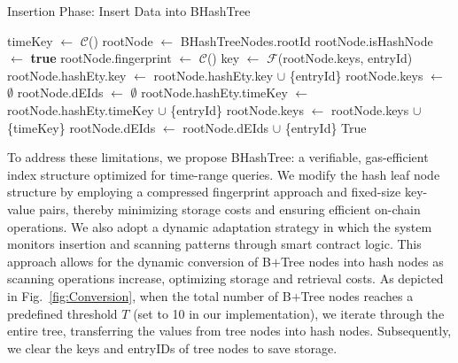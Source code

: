 \begin{algorithm}[htbp]
\caption{Insertion Phase: Insert Data into BHashTree}
\label{Insert_Phase_BHashTree}
\begin{algorithmic}[1]
    \State timeKey $\gets$ $\mathcal{C}$()
    \State rootNode $\gets$ BHashTreeNodes.rootId
        \State rootNode.isHashNode $\gets$ \textbf{true}
        \State rootNode.fingerprint $\gets$ $\mathcal{C}$() 
            \State key $\gets$ $\mathcal{F}$(rootNode.keys, entryId)
            \State rootNode.hashEty.key $\gets$ rootNode.hashEty.key $\cup$ \{entryId\}
        \EndFor
        \State rootNode.keys $\gets$ $\emptyset$
        \State rootNode.dEIds $\gets$ $\emptyset$
    \EndIf
        \State rootNode.hashEty.timeKey $\gets$ rootNode.hashEty.timeKey $\cup$ \{entryId\}
    \Else
        \State rootNode.keys $\gets$ rootNode.keys $\cup$ \{timeKey\}
        \State rootNode.dEIds $\gets$ rootNode.dEIds $\cup$ \{entryId\}
    \EndIf
    \State \Return True
\EndFunction
\end{algorithmic}
\end{algorithm}


To address these limitations, we propose BHashTree: a verifiable, gas-efficient index structure optimized for time-range queries. 
We modify the hash leaf node structure by employing a compressed fingerprint approach and fixed-size key-value pairs, thereby minimizing storage costs and ensuring efficient on-chain operations. 
We also adopt a dynamic adaptation strategy in which the system monitors insertion and scanning patterns through smart contract logic. This approach allows for the dynamic conversion of B\(+\)Tree nodes into hash nodes as scanning operations increase, optimizing storage and retrieval costs. 
As depicted in Fig.~\ref{fig:Conversion}, when the total number of B\(+\)Tree nodes reaches a predefined threshold \(T\) (set to 10 in our implementation), we iterate through the entire tree, transferring the values from tree nodes into hash nodes. 
Subsequently, we clear the keys and entryIDs of tree nodes to save storage.


